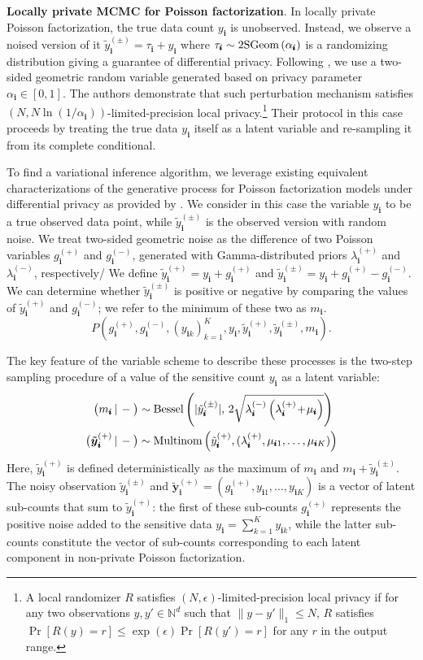 \documentclass[letterpaper]{article}
\newcommand{\subs}{\pmb{i}}
\newcommand{\wsup}[2]{#1_{\subs}^{(#2)}}
\newcommand{\ytP}{\wsup{\tilde{y}}{+}}
\newcommand{\ytPM}{\wsup{\tilde{y}}{\pm}}
\newcommand{\ysk}{y_{\subs k}}
\newcommand{\ys}{y_{\subs}}
\newcommand{\taus}{\tau_{\subs}}
\newcommand{\lamP}{\wsup{\lambda}{+}}
\newcommand{\lamM}{\wsup{\lambda}{-}}
\newcommand{\gP}{\wsup{g}{+}}
\newcommand{\gM}{\wsup{g}{-}}
\newcommand{\mus}{\mu_{\subs}}
\newcommand{\ms}{m_{\subs}}
\newcommand{\Bess}[1]{\textup{Bessel}\left( #1 \right)}
\newcommand{\Binom}[1]{\textup{Binom}\left( #1 \right)}
\newcommand{\Multi}[1]{\textup{Multinom}\left( #1 \right)}
\newcommand{\Geo}[1]{\textup{2SGeom}\left( #1 \right)}
\newcommand{\given}{\,|\,}
\newcommand{\tp}{\!+\!}
\newcommand{\compcond}[1]{\big(#1\given-\big)}
\newcommand{\yvtP}{\boldsymbol{\tilde{y}}_{\subs}^{(+)}}
\begin{document}
  \textbf{Locally private MCMC for Poisson factorization}. In locally private
  Poisson factorization, the true data count $\ys$ is unobserved. Instead, we
  observe a noised version of it $\ytPM = \taus + \ys$ where $\taus \sim
  \Geo{\alpha_{\subs}}$ is a randomizing distribution giving a guarantee of
  differential privacy. Following \cite{schein2018locally}, we use a two-sided
  geometric random variable generated based on privacy parameter $\alpha_{\subs} \in [0,1]$.
  The authors demonstrate that such perturbation mechanism satisfies $(N, N
  \ln(1/\alpha_{\subs}))$-limited-precision local privacy.\footnote{A local
  randomizer $R$ satisfies $(N, \epsilon)$-limited-precision local privacy if
  for any two observations $y,y'\in \mathbb{N}^d$ such that $\|y-y'\|_1\leq N$,
  $R$ satisfies $\Pr[R(y) = r] \leq \exp(\epsilon)\Pr[R(y') = r]$ for any $r$ in
  the output range.} Their protocol in this case proceeds by treating the true data $\ys$
  itself as a latent variable and re-sampling it from its complete conditional.

  To find a variational inference algorithm, we leverage existing equivalent
  characterizations of the generative process for Poisson factorization models
  under differential privacy as provided by \citep{schein2018locally}.
  We consider in this case the variable $\ys$ to be
  a true observed data point, while $\ytPM$ is the observed version with random
  noise. We treat two-sided geometric noise as the difference of two
  Poisson variables $\gP$ and $\gM$, generated with Gamma-distributed priors
  $\lamP$ and $\lamM$, respectively/ We define $\ytP = \ys + \gP$ and $\ytPM =
  \ys + \gP - \gM$. We can determine whether $\ytPM$ is positive or negative by
  comparing the values of $\ytP$ and $\gM$; we refer to the minimum of these two
  as $\ms$.
  \begin{equation}
  P\left(\gP, \gM, \left(\ysk\right)_{k=1}^K, \ys,
    \ytP, \ytPM, \ms\right).
  \end{equation}

  The key feature of the variable scheme to describe these processes is the
  two-step sampling procedure of a value of the sensitive count $\ys$ as a
  latent variable:
  \begin{align}
  \compcond{\ms} &\sim \Bess{|\ytPM|,\, 2\sqrt{\lamM\left(\lamP \tp \mus\right)}} \label{eq:bess}\\
  \compcond{\yvtP} &\sim \Multi{\ytP, (\lamP, \mu_{\subs 1}, \dots, \mu_{\subs K})}
  \end{align} 
  Here, $\ytP$ is defined deterministically as the maximum of $\ms$ and $\ms +
  \ytPM$. The noisy observation $\ytPM$ and $\yvtP=(\gP, y_{\subs 1}, \dots,
  y_{\subs K})$ is a vector of latent sub-counts that sum to $\ytP$: the first
  of these sub-counts $\gP$ represents the positive noise added to the sensitive
  data $\ys=\sum_{k=1}^K \ysk$, while the latter sub-counts constitute the
  vector of sub-counts corresponding to each latent component in non-private
  Poisson factorization.
\end{document}
